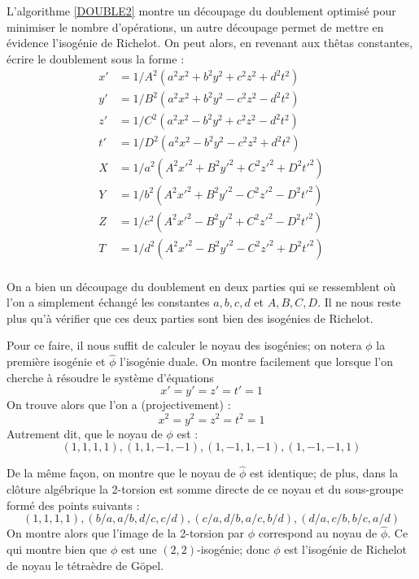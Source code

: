 \documentclass[a4paper]{article}
\theoremstyle{definition}
\theoremstyle{remark}
\numberwithin{equation}{section}
\begin{document}
L'algorithme \ref{DOUBLE2} montre un découpage du doublement optimisé pour minimiser le nombre d'opérations, un autre découpage permet de mettre en évidence l'isogénie de Richelot. On peut alors, en revenant aux thêtas constantes, écrire le doublement sous la forme : 
\begin{align*}
x' &= 1/A^2(a^2x^2 + b^2y^2 + c^2z^2 + d^2t^2) \\
y' &= 1/B^2(a^2x^2 + b^2y^2 - c^2z^2 - d^2t^2) \\
z' &= 1/C^2(a^2x^2 - b^2y^2 + c^2z^2 - d^2t^2) \\
t' &= 1/D^2(a^2x^2 - b^2y^2 - c^2z^2 + d^2t^2) \\
X &= 1/a^2(A^2x'^2 + B^2y'^2 + C^2z'^2 + D^2t'^2) \\
Y &= 1/b^2(A^2x'^2 + B^2y'^2 - C^2z'^2 - D^2t'^2) \\
Z &= 1/c^2(A^2x'^2 - B^2y'^2 + C^2z'^2 - D^2t'^2) \\
T &= 1/d^2(A^2x'^2 - B^2y'^2 - C^2z'^2 + D^2t'^2) \\
\end{align*}

On a bien un découpage du doublement en deux parties qui se ressemblent où l'on a simplement échangé les constantes $a,b,c,d$ et $A,B,C,D$. Il ne nous reste plus qu'à vérifier que ces deux parties sont bien des isogénies de Richelot.

Pour ce faire, il nous suffit de calculer le noyau des isogénies; on notera $\phi$ la première isogénie et $\hat{\phi}$ l'isogénie duale. On montre facilement que lorsque l'on cherche à résoudre le système d'équations
$$x' = y' = z' = t' = 1$$
On trouve alors que l'on a (projectivement) :
$$x^2 = y^2 = z^2 = t^2 = 1$$
Autrement dit, que le noyau de $\phi$ est :
$$(1,1,1,1),(1,1,-1,-1),(1,-1,1,-1),(1,-1,-1,1)$$

De la même façon, on montre que le noyau de $\hat{\phi}$ est identique; de plus, dans la clôture algébrique la 2-torsion est somme directe de ce noyau et du sous-groupe formé des points suivants :
$$(1,1,1,1),(b/a,a/b,d/c,c/d),(c/a,d/b,a/c,b/d),(d/a,c/b,b/c,a/d)$$
On montre alors que l'image de la 2-torsion par $\phi$ correspond au noyau de $\hat{\phi}$.
Ce qui montre bien que $\phi$ est une $(2,2)$-isogénie; donc $\phi$ est l'isogénie de Richelot de noyau le tétraèdre de G\"opel.
\end{document}
